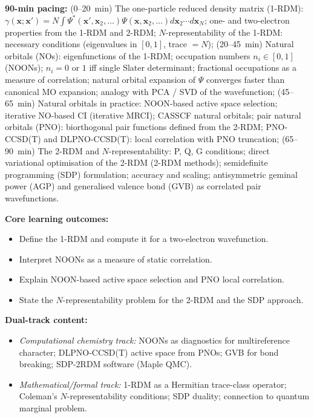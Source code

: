 \documentclass[11pt,a4paper]{article}
\begin{document}
\begin{tcolorbox}[modulebox, title={Module~II.1 / L09: Natural Orbitals and the One-Particle Density Matrix}]
\textbf{90-min pacing:} (0--20~min) The one-particle reduced density matrix (1-RDM):
$\gamma(\mathbf{x};\mathbf{x}')=N\int\Psi^*(\mathbf{x}',\mathbf{x}_2,\ldots)\Psi(\mathbf{x},\mathbf{x}_2,\ldots)d\mathbf{x}_2\cdots d\mathbf{x}_N$;
one- and two-electron properties from the 1-RDM and 2-RDM;
$N$-representability of the 1-RDM: necessary conditions (eigenvalues in $[0,1]$, trace $=N$);
(20--45~min) Natural orbitals (NOs): eigenfunctions of the 1-RDM;
occupation numbers $n_i\in[0,1]$ (NOONs); $n_i=0$ or $1$ iff single Slater determinant;
fractional occupations as a measure of correlation; natural orbital expansion of $\Psi$
converges faster than canonical MO expansion; analogy with PCA / SVD of the wavefunction;
(45--65~min) Natural orbitals in practice: NOON-based active space selection;
iterative NO-based CI (iterative MRCI); CASSCF natural orbitals;
pair natural orbitals (PNO): biorthogonal pair functions defined from the 2-RDM;
PNO-CCSD(T) and DLPNO-CCSD(T): local correlation with PNO truncation;
(65--90~min) The 2-RDM and $N$-representability: P, Q, G conditions;
direct variational optimisation of the 2-RDM (2-RDM methods);
semidefinite programming (SDP) formulation; accuracy and scaling;
antisymmetric geminal power (AGP) and generalised valence bond (GVB) as
correlated pair wavefunctions.

\medskip\textbf{Core learning outcomes:}
\begin{itemize}[leftmargin=1.4em,topsep=2pt,itemsep=1pt]
  \item Define the 1-RDM and compute it for a two-electron wavefunction.
  \item Interpret NOONs as a measure of static correlation.
  \item Explain NOON-based active space selection and PNO local correlation.
  \item State the $N$-representability problem for the 2-RDM and the SDP approach.
\end{itemize}

\medskip\textbf{Dual-track content:}
\begin{itemize}[leftmargin=1.4em,topsep=2pt,itemsep=1pt]
  \item \textit{Computational chemistry track:} NOONs as diagnostics for multireference character;
    DLPNO-CCSD(T) active space from PNOs; GVB for bond breaking; SDP-2RDM software (Maple QMC).
  \item \textit{Mathematical/formal track:} 1-RDM as a Hermitian trace-class operator;
    Coleman's $N$-representability conditions; SDP duality; connection to quantum marginal problem.
\end{itemize}


\end{tcolorbox}
\end{document}
